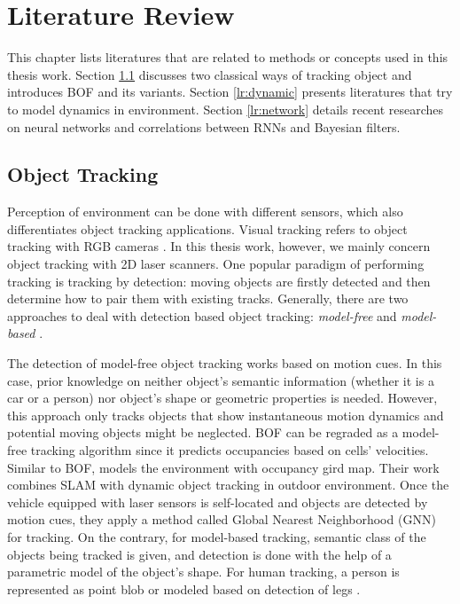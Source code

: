 \chapter{Literature Review} \label{chapter:2}

This chapter lists literatures that are related to methods or concepts used in this thesis work. Section \ref{lr:tracking} discusses two classical ways of tracking object and introduces BOF and its variants. Section \ref{lr:dynamic} presents literatures that try to model dynamics in environment. Section \ref{lr:network} details recent researches on neural networks and correlations between RNNs and Bayesian filters. 

\section{Object Tracking} \label{lr:tracking}

Perception of environment can be done with different sensors, which also differentiates object tracking applications. Visual tracking refers to object tracking with RGB cameras \citep{ross2008incremental}. In this thesis work, however, we mainly concern object tracking with 2D laser scanners. One popular paradigm of performing tracking is tracking by detection: moving objects are firstly detected and then determine how to pair them with existing tracks. Generally, there are two approaches to deal with detection based object tracking: \textit{model-free} and \textit{model-based} \citep{wang2015model}. 

The detection of model-free object tracking works based on motion cues. In this case, prior knowledge on neither object's semantic information (whether it is a car or a person) nor object's shape or geometric properties is needed. However, this approach only tracks objects that show instantaneous motion dynamics and potential moving objects might be neglected. BOF can be regraded as a model-free tracking algorithm since it predicts occupancies based on cells' velocities. Similar to BOF, \citet{ross2008incremental} models the environment with occupancy gird map. Their work combines SLAM with dynamic object tracking in outdoor environment. Once the vehicle equipped with laser sensors is self-located and objects are detected by motion cues, they apply a method called Global Nearest Neighborhood (GNN) for tracking. On the contrary, for model-based tracking, semantic class of the objects being tracked is given, and detection is done with the help of a parametric model of the object's shape. For human tracking, a person is represented as point blob or modeled based on detection of legs \citep{arras2008efficient, cui2006laser}. 

